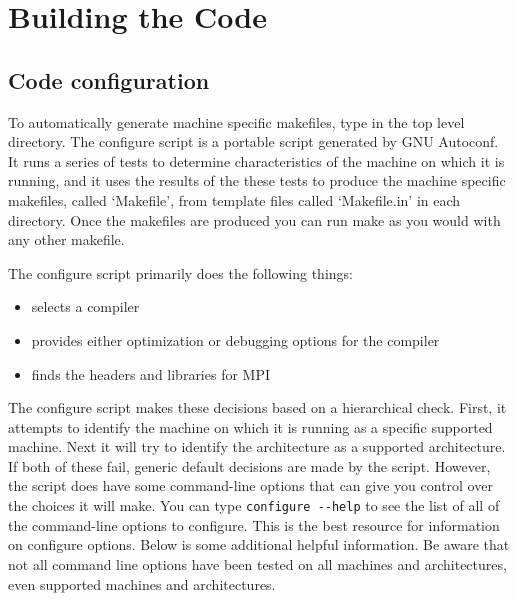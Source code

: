 \chapter{Building the Code}
\section{Code configuration}

To automatically generate machine specific makefiles, type
 in the top level directory.  The configure
script is a portable script generated by GNU Autoconf.  It runs a
series of tests to determine characteristics of the machine on which
it is running, and it uses the results of the these tests to produce
the machine specific makefiles, called `Makefile', from template files
called `Makefile.in' in each directory.  Once the makefiles are
produced you can run make as you would with any other makefile.

The configure script primarily does the following things:
\begin{itemize}
\item selects a compiler
\item provides either optimization or debugging options for the compiler
\item finds the headers and libraries for MPI
\end{itemize}

The configure script makes these decisions based on a hierarchical check.  First, it attempts to identify the machine on which it is running as a specific supported machine.  Next it will try to identify the architecture as a supported architecture.  If both of these fail, generic default decisions are made by the script.  However, the script does have some command-line options that can give you control over the choices it will make.  You can type
\verb+configure --help+
to see the list of all of the command-line options to configure. This is
the best resource for information on configure options.  Below is some
additional helpful information.  Be aware that not all command line options
have been tested on all machines and architectures, even supported machines and architectures. 



